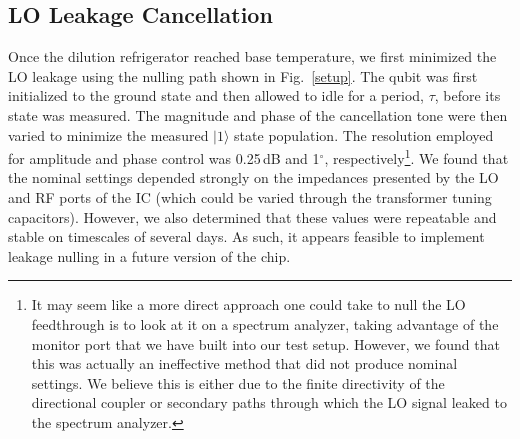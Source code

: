 \documentclass[journal]{IEEEtran}
\newcommand{\CR}[1]{{\color{black}#1}}
\begin{document}
\subsection{LO Leakage Cancellation} %
Once the \CR{dilution refrigerator} reached base temperature, we first minimized the LO leakage using the \CR{nulling} path shown in Fig.~\ref{setup}.  The qubit was first initialized to the ground state and then allowed to idle for a period, $\tau$, before its state was measured. The magnitude and phase of the cancellation tone were then varied to minimize the measured $|1\rangle$ state population.  The resolution employed for amplitude and phase control was 0.25\,dB and 1$^\circ$, respectively\footnote{It may seem like a more direct approach one could take to null the LO feedthrough is to look at it on a spectrum analyzer, taking advantage of the monitor port that we have built into our test setup. However, we found that this was actually an ineffective method that did not produce nominal settings. We believe this is either due to the finite directivity of the directional coupler or secondary paths through which the LO signal leaked to the spectrum analyzer.}. We found that the nominal settings depended strongly on the impedances presented by the LO and RF ports of the IC (which could be varied through the transformer tuning capacitors). However, we also determined that these values were repeatable and stable on timescales of several days. As such, it appears feasible to implement leakage nulling in a future version of the chip.
\end{document}
